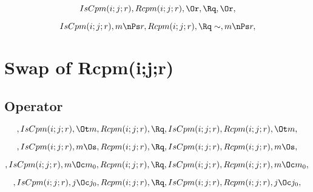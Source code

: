 \[\, IsCpm(i;j;r), Rcpm(i;j;r), \Or, \Rq , \Or, \]


\[\, IsCpm(i;j;r), m \nPs r, Rcpm(i;j;r), \Rq \sim, m \nPs r, \]


\bigskip
\bigskip
\section{Swap of Rcpm(i;j;r)}
\subsection{Operator}
\[, IsCpm(i;j;r), \Ot m, Rcpm(i;j;r), \Rq , IsCpm(i;j;r), Rcpm(i;j;r), \Ot m,\]

\[, IsCpm(i;j;r), m \Os, Rcpm(i;j;r), \Rq , IsCpm(i;j;r), Rcpm(i;j;r), m \Os,\]

\[, IsCpm(i;j;r), m \Oc m_0, Rcpm(i;j;r), \Rq , IsCpm(i;j;r), Rcpm(i;j;r), m \Oc m_0,\]

\[, IsCpm(i;j;r), j \Oc j_0, Rcpm(i;j;r), \Rq , IsCpm(i;j;r), Rcpm(i;j;r), j \Oc j_0,\]



